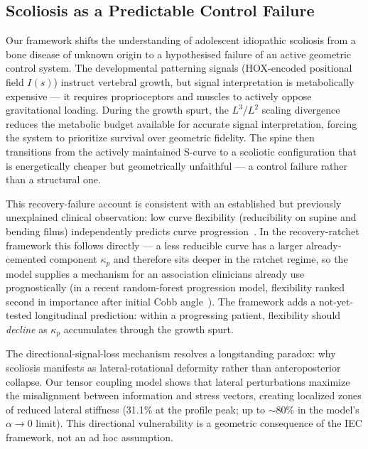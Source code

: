 \subsection{Scoliosis as a Predictable Control Failure}

Our framework shifts the understanding of adolescent idiopathic scoliosis from a bone disease of unknown origin to a hypothesised failure of an active geometric control system. The developmental patterning signals (HOX-encoded positional field $I(s)$) instruct vertebral growth, but signal interpretation is metabolically expensive --- it requires proprioceptors and muscles to actively oppose gravitational loading. During the growth spurt, the $L^3$/$L^2$ scaling divergence reduces the metabolic budget available for accurate signal interpretation, forcing the system to prioritize survival over geometric fidelity. The spine then transitions from the actively maintained S-curve to a scoliotic configuration that is energetically cheaper but geometrically unfaithful --- a control failure rather than a structural one.

This recovery-failure account is consistent with an established but previously unexplained clinical observation: low curve flexibility (reducibility on supine and bending films) independently predicts curve progression~\cite{cheung2020supine, ohrtnissen2016flexibility, alfraihat2022random}. In the recovery-ratchet framework this follows directly --- a less reducible curve has a larger already-cemented component $\kappa_p$ and therefore sits deeper in the ratchet regime, so the model supplies a mechanism for an association clinicians already use prognostically (in a recent random-forest progression model, flexibility ranked second in importance after initial Cobb angle~\cite{alfraihat2022random}). The framework adds a not-yet-tested longitudinal prediction: within a progressing patient, flexibility should \emph{decline} as $\kappa_p$ accumulates through the growth spurt.

The directional-signal-loss mechanism resolves a longstanding paradox: why scoliosis manifests as lateral-rotational deformity rather than anteroposterior collapse. Our tensor coupling model shows that lateral perturbations maximize the misalignment between information and stress vectors, creating localized zones of reduced lateral stiffness (31.1\% at the profile peak; up to ${\sim}80\%$ in the model's $\alpha \to 0$ limit). This directional vulnerability is a geometric consequence of the IEC framework, not an ad hoc assumption.

